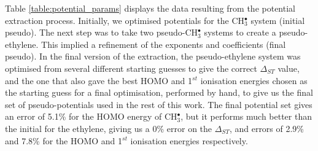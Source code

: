 \documentclass[12pt]{article}
\begin{document}
Table \ref{table:potential_params} displays the data resulting from the potential extraction process. 
Initially, we optimised potentials for the CH$_3^\bullet$ system (initial pseudo).
The next step was to take two pseudo-CH\(^{\bullet}_{3}\) systems to create a pseudo-ethylene. 
This implied a refinement of the exponents and coefficients (final pseudo).
In the final version of the extraction, the pseudo-ethylene system was optimised from several different starting guesses to give the correct $\Delta_{ST}$ value, and the one that also gave the best HOMO and 1$^{st}$ ionisation energies chosen as the starting guess for a final optimisation, performed by hand, to give us the final set of pseudo-potentials used in the rest of this work.
The final potential set gives an error of 5.1\% for the HOMO energy of CH\(^{\bullet}_{3}\), but it
performs much better than the initial for the ethylene,
giving us a 0\% error on the $\Delta_{ST}$, and errors of 2.9\% and 7.8\% for the HOMO and 1$^{st}$ ionisation energies respectively.
\end{document}
